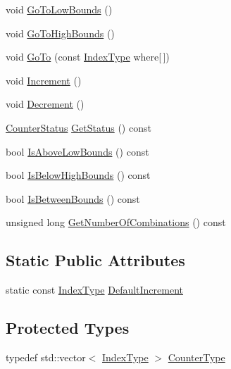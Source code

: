 \begin{DoxyCompactItemize}
void \hyperlink{classnmr_multi_index_counter_ae5fb12e3882847ee14cee8ba21875396}{Go\-To\-Low\-Bounds} ()
\item 
void \hyperlink{classnmr_multi_index_counter_afa35aaa35926a8a1f7efcb4ccf497e1e}{Go\-To\-High\-Bounds} ()
\item 
void \hyperlink{classnmr_multi_index_counter_a8cd1eda014a543a7ba87934e4a13bccf}{Go\-To} (const \hyperlink{classnmr_multi_index_counter_a0632b941a7d18df347174b4345d73d01}{Index\-Type} where\mbox{[}$\,$\mbox{]})
\item 
void \hyperlink{classnmr_multi_index_counter_a416332f70e6bb44f19e4f6c57ca27c89}{Increment} ()
\item 
void \hyperlink{classnmr_multi_index_counter_a3109fdcc4f5dc8fcb33178aa7e54ebe9}{Decrement} ()
\item 
\hyperlink{classnmr_multi_index_counter_ad7beda3a3ee347140b4b5540770aeba5}{Counter\-Status} \hyperlink{classnmr_multi_index_counter_a5dbdd9560461b3aebfd96450628c310c}{Get\-Status} () const 
\item 
bool \hyperlink{classnmr_multi_index_counter_aea788aeae415ecef850e88d9e4b57e8b}{Is\-Above\-Low\-Bounds} () const 
\item 
bool \hyperlink{classnmr_multi_index_counter_a8c7c363007ec541a0da961bbe3ef07f6}{Is\-Below\-High\-Bounds} () const 
\item 
bool \hyperlink{classnmr_multi_index_counter_ab0a755e3c12f7040c5525e893ca363a3}{Is\-Between\-Bounds} () const 
\item 
unsigned long \hyperlink{classnmr_multi_index_counter_a531ba6fe86d8cdd83fa8b305aa4f1763}{Get\-Number\-Of\-Combinations} () const 
\end{DoxyCompactItemize}
\subsection*{Static Public Attributes}
\begin{DoxyCompactItemize}
\item 
static const \hyperlink{classnmr_multi_index_counter_a0632b941a7d18df347174b4345d73d01}{Index\-Type} \hyperlink{classnmr_multi_index_counter_ab2fdae32774037be720daec2ad869d04}{Default\-Increment}
\end{DoxyCompactItemize}
\subsection*{Protected Types}
\begin{DoxyCompactItemize}
\item 
typedef std\-::vector$<$ \hyperlink{classnmr_multi_index_counter_a0632b941a7d18df347174b4345d73d01}{Index\-Type} $>$ \hyperlink{classnmr_multi_index_counter_a6f7f42508ddcc24c957f012ffbcce57d}{Counter\-Type}
\end{DoxyCompactItemize}

